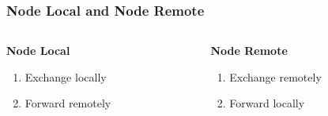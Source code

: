 \documentclass{beamer}
\begin{document}
\begin{frame}
\frametitle{Node Local and Node Remote}


\begin{columns}
	\begin{column}{0.5\textwidth}
		\textbf{Node Local}
		\begin{enumerate}
			\setlength\itemsep{0.5em}
			\item Exchange locally
			\item Forward remotely
		\end{enumerate}
	\end{column}
	\begin{column}{0.5\textwidth}  %
		\textbf{Node Remote} \checkmark
		\begin{enumerate}
			\setlength\itemsep{0.5em}
			\item Exchange remotely
			\item Forward locally
		\end{enumerate}
	\end{column}
\end{columns}


\end{frame}
\end{document}
